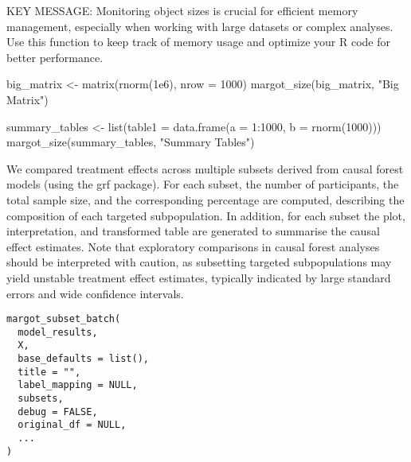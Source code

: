 \documentclass[a4paper]{book}
\begin{document}
%
\begin{Note}
KEY MESSAGE: Monitoring object sizes is crucial for efficient memory
management, especially when working with large datasets or complex
analyses. Use this function to keep track of memory usage and optimize
your R code for better performance.
\end{Note}
%
\begin{Examples}
\begin{ExampleCode}
big_matrix <- matrix(rnorm(1e6), nrow = 1000)
margot_size(big_matrix, "Big Matrix")

summary_tables <- list(table1 = data.frame(a = 1:1000, b = rnorm(1000)))
margot_size(summary_tables, "Summary Tables")

\end{ExampleCode}
\end{Examples}
%
\begin{Description}
We compared treatment effects across multiple subsets derived from causal forest models (using the grf package).
For each subset, the number of participants, the total sample size, and the corresponding percentage are computed,
describing the composition of each targeted subpopulation. In addition, for each subset the plot, interpretation, and
transformed table are generated to summarise the causal effect estimates. Note that exploratory comparisons in causal
forest analyses should be interpreted with caution, as subsetting targeted subpopulations may yield unstable treatment
effect estimates, typically indicated by large standard errors and wide confidence intervals.
\end{Description}
%
\begin{Usage}
\begin{verbatim}
margot_subset_batch(
  model_results,
  X,
  base_defaults = list(),
  title = "",
  label_mapping = NULL,
  subsets,
  debug = FALSE,
  original_df = NULL,
  ...
)
\end{verbatim}
\end{Usage}
%
\end{document}
